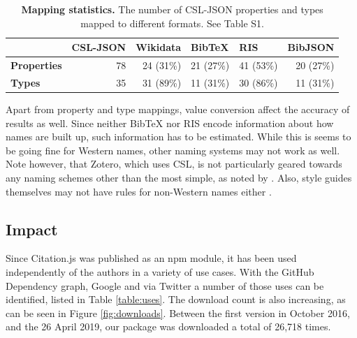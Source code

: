 \documentclass[fleqn,10pt,lineno]{wlpeerj} %
\begin{document}
\begin{table}[bt]
\caption{\textbf{Mapping statistics.} The number of CSL-JSON properties and types mapped to different formats. See Table S1. }
\label{table:completeness}
\begin{tabular}{l|r|r|r|r|r|}
\cline{2-6}
                                          & \multicolumn{1}{l|}{\textbf{CSL-JSON}} & \multicolumn{1}{l|}{\textbf{Wikidata}} & \multicolumn{1}{l|}{\textbf{BibTeX}} & \multicolumn{1}{l|}{\textbf{RIS}} & \multicolumn{1}{l|}{\textbf{BibJSON}} \\ \hline
\multicolumn{1}{|l|}{\textbf{Properties}} & 78                                     & 24 (31\%)                              & 21 (27\%)                            & 41 (53\%)                         & 20 (27\%)                             \\ \hline
\multicolumn{1}{|l|}{\textbf{Types}}      & 35                                     & 31 (89\%)                              & 11 (31\%)                            & 30 (86\%)                         & 11 (31\%)                             \\ \hline
\end{tabular}
\end{table}

Apart from property and type mappings, value conversion affect the accuracy of results as well. Since neither BibTeX nor RIS encode information about how names are built up, such information has to be estimated. While this is seems to be going fine for Western names, other naming systems may not work as well. Note however, that Zotero, which uses CSL, is not particularly geared towards any naming schemes other than the most simple, as noted by 
\cite{darcus_non-western_2008}. Also, style guides themselves may not have rules for non-Western names either \citep{qiu_scientific_2008,puniamoorthy_give_2008}.

\subsection*{Impact}

Since Citation.js was published as an npm module, it has been used independently of the authors in a variety of use cases. With the GitHub Dependency graph, Google and via Twitter a number of those uses can be identified, listed in Table \ref{table:uses}. The download count is also increasing, as can be seen in Figure \ref{fig:downloads}. Between the first version in October 2016, and the 26 April 2019, our package was downloaded a total of 26,718 times.
\end{document}
